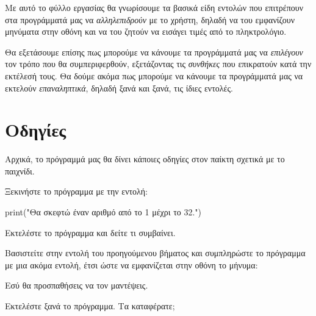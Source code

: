 \documentclass[a4paper,11pt,oneside]{book}
\begin{document}


%
Με αυτό το φύλλο εργασίας θα γνωρίσουμε τα βασικά είδη εντολών που επιτρέπουν στα προγράμματά μας να \emph{αλληλεπιδρούν} με το χρήστη, δηλαδή να του εμφανίζουν μηνύματα στην οθόνη και να του ζητούν να εισάγει τιμές από το πληκτρολόγιο. 

Θα εξετάσουμε επίσης πως μπορούμε να κάνουμε τα προγράμματά μας να \emph{επιλέγουν} τον τρόπο που θα συμπεριφερθούν, εξετάζοντας τις \emph{συνθήκες} που επικρατούν κατά την εκτέλεσή τους. Θα δούμε ακόμα πως μπορούμε να κάνουμε τα προγράμματά μας να εκτελούν \emph{επαναληπτικά}, δηλαδή ξανά και ξανά, τις ίδιες εντολές.

\section{Οδηγίες}

Αρχικά, το πρόγραμμά μας θα δίνει κάποιες οδηγίες στον παίκτη σχετικά με το παιχνίδι.

\begin{step}
Ξεκινήστε το πρόγραμμα με την εντολή:

\begin{pynew}
print("Θα σκεφτώ έναν αριθμό από το 1 μέχρι το 32.")
\end{pynew}

Εκτελέστε το πρόγραμμα και δείτε τι συμβαίνει.
\end{step}

\begin{step}
Βασιστείτε στην εντολή του προηγούμενου βήματος και συμπληρώστε το πρόγραμμα με μια ακόμα εντολή, έτσι ώστε να εμφανίζεται στην οθόνη το μήνυμα:

\marginnote[16pt]{\iconcomputer}
\begin{pyterm}
Εσύ θα προσπαθήσεις να τον μαντέψεις.
\end{pyterm}

Εκτελέστε ξανά το πρόγραμμα. Τα καταφέρατε;

\marginnote[14pt]{\icondiscuss}
\dottedline
\end{step}
\end{document}
